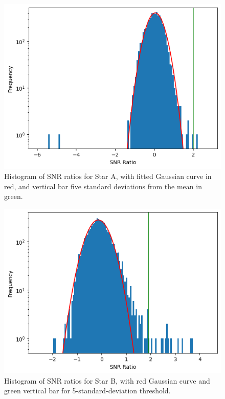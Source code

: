 \documentclass{article}
\begin{document}
\begin{figure}[h]
    \centering
    \includegraphics[scale=0.6]{333_hist.png}
    \caption{Histogram of SNR ratios for Star A, with fitted Gaussian curve in red, and vertical bar five standard deviations from the mean in green.}
    \label{img:histA}
\end{figure}

\begin{figure}[t]
    \centering
    \includegraphics[scale=0.6]{109_hist.png}
    \caption{Histogram of SNR ratios for Star B, with red Gaussian curve and green vertical bar for 5-standard-deviation threshold.}
    \label{img:histB}
\end{figure}
\end{document}
